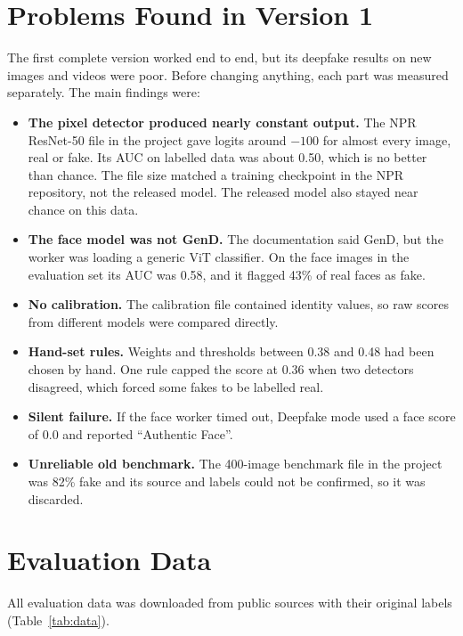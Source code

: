 \documentclass[12pt,a4paper,oneside]{report}
\begin{document}
\section{Problems Found in Version 1}
The first complete version worked end to end, but its deepfake results on new images and videos were poor. Before changing anything, each part was measured separately. The main findings were:
\begin{itemize}
  \item \textbf{The pixel detector produced nearly constant output.} The NPR ResNet-50 file in the project gave logits around $-100$ for almost every image, real or fake. Its AUC on labelled data was about 0.50, which is no better than chance. The file size matched a training checkpoint in the NPR repository, not the released model. The released model also stayed near chance on this data.
  \item \textbf{The face model was not GenD.} The documentation said GenD, but the worker was loading a generic ViT classifier. On the face images in the evaluation set its AUC was 0.58, and it flagged 43\% of real faces as fake.
  \item \textbf{No calibration.} The calibration file contained identity values, so raw scores from different models were compared directly.
  \item \textbf{Hand-set rules.} Weights and thresholds between 0.38 and 0.48 had been chosen by hand. One rule capped the score at 0.36 when two detectors disagreed, which forced some fakes to be labelled real.
  \item \textbf{Silent failure.} If the face worker timed out, Deepfake mode used a face score of 0.0 and reported ``Authentic Face''.
  \item \textbf{Unreliable old benchmark.} The 400-image benchmark file in the project was 82\% fake and its source and labels could not be confirmed, so it was discarded.
\end{itemize}

\section{Evaluation Data}
All evaluation data was downloaded from public sources with their original labels (Table~\ref{tab:data}).
\end{document}
